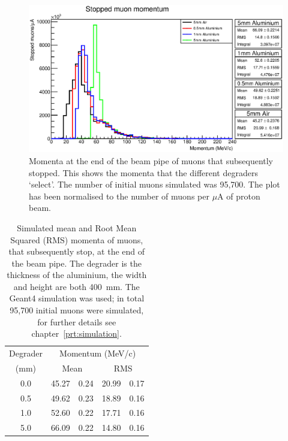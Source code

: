 \begin{figure}[hptb]
  \centering
    \includegraphics[width=.8\textwidth]{images/momentum_spectrum/stopped_muon_momentum.eps}
  \caption{Momenta at the end of the beam pipe of muons that subsequently stopped. This shows the momenta that the different degraders `select'. The number of initial muons simulated was 95,700. The plot has been normalised to the number of muons per \(\mu\)A of proton beam.}
  \label{fig:images_momentum_spectrum_stopped_muon_momentum}
\end{figure}

\begin{table}
  \lineup
  \begin{center}
  \begin{tabular}{c | r@{\(\pm\)}l | r@{\(\pm\)}l }
    Degrader  &  \multicolumn{4}{c}{Momentum (MeV/c)}      \\
      (mm)    &  \multicolumn{2}{c|}{Mean}  
                               &  \multicolumn{2}{c}{RMS}  \\
    \hline
      0.0     &  45.27 & 0.24  &  20.99 & 0.17             \\
      0.5     &  49.62 & 0.23  &  18.89 & 0.16             \\
      1.0     &  52.60 & 0.22  &  17.71 & 0.16             \\
      5.0     &  66.09 & 0.22  &  14.80 & 0.16             \\
  \end{tabular}
  \end{center}
  \caption{Simulated mean and Root Mean Squared (RMS) momenta of muons, that subsequently stop, at the end of the beam pipe. The degrader is the thickness of the aluminium, the width and height are both 400~mm. The Geant4 simulation was used; in total 95,700 initial muons were simulated, for further details see chapter~\ref{prt:simulation}.}
  \label{tab:stopped_muon_mom}
\end{table}

